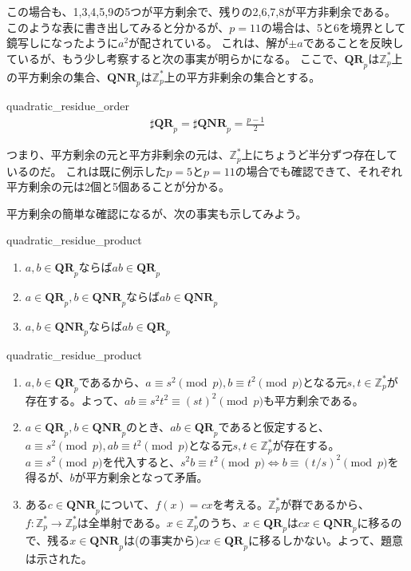 この場合も、1,3,4,5,9の5つが平方剰余で、残りの2,6,7,8が平方非剰余である。
このような表に書き出してみると分かるが、$p=11$の場合は、5と6を境界として鏡写しになったように$a^2$が配されている。
これは、解が$\pm a$であることを反映しているが、もう少し考察すると次の事実が明らかになる。
ここで、$\mathbf{QR}_p$は$\mathbb{Z}_p^*$上の平方剰余の集合、$\mathbf{QNR}_p$は$\mathbb{Z}_p^*$上の平方非剰余の集合とする。

\begin{Prop}{}{quadratic_residue_order}
\begin{align*}
\sharp\mathbf{QR}_p = \sharp\mathbf{QNR}_p = \frac{p-1}{2}
\end{align*}
\end{Prop}

つまり、平方剰余の元と平方非剰余の元は、$\mathbb{Z}_p^*$上にちょうど半分ずつ存在しているのだ。
これは既に例示した$p=5$と$p=11$の場合でも確認できて、それぞれ平方剰余の元は2個と5個あることが分かる。

平方剰余の簡単な確認になるが、次の事実も示してみよう。

\begin{Prop}{}{quadratic_residue_product}\;
\begin{enumerate}
 \item $a,b\in\mathbf{QR}_p$ならば$ab\in\mathbf{QR}_p$
 \item $a\in\mathbf{QR}_p, b\in\mathbf{QNR}_p$ならば$ab\in\mathbf{QNR}_p$
 \item $a,b\in\mathbf{QNR}_p$ならば$ab\in\mathbf{QR}_p$
\end{enumerate}
\end{Prop}

\begin{prProof}{quadratic_residue_product}\;
\begin{enumerate}
 \item $a,b\in\mathbf{QR}_p$であるから、$a\equiv s^2\pmod{p}, b\equiv t^2\pmod{p}$となる元$s,t\in\mathbb{Z}_p^*$が存在する。よって、$ab\equiv s^2t^2\equiv(st)^2\pmod{p}$も平方剰余である。
 \item $a\in\mathbf{QR}_p, b\in\mathbf{QNR}_p$のとき、$ab\in\mathbf{QR}_p$であると仮定すると、$a\equiv s^2\pmod{p}, ab\equiv t^2\pmod{p}$となる元$s,t\in\mathbb{Z}_p^*$が存在する。$a\equiv s^2\pmod{p}$を代入すると、$s^2b\equiv t^2\pmod{p}\iff b\equiv (t/s)^2\pmod{p}$を得るが、$b$が平方剰余となって矛盾。
 \item ある$c \in \mathbf{QNR}_p$について、$f(x)=cx$を考える。$\mathbb{Z}_p^*$が群であるから、$f:\mathbb{Z}_p^*\to\mathbb{Z}_p^*$は全単射である。$x \in \mathbb{Z}_p^*$のうち、$x\in\mathbf{QR}_p$は$cx\in\mathbf{QNR}_p$に移るので、残る$x\in\mathbf{QNR}_p$は(の事実から)$cx\in\mathbf{QR}_p$に移るしかない。よって、題意は示された。
\end{enumerate}
\end{prProof}

